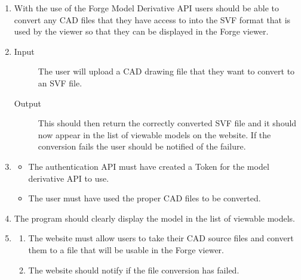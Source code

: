 \documentclass[letterpaper, 10pt, draftclsnofoot, compsoc, onecolumn]{IEEEtran}
\begin{document}
\begin{enumerate}
	\item With the use of the Forge Model Derivative API users should be able to convert any CAD files that they have access to into the SVF format
	that is used by the viewer so that they can be displayed in the Forge viewer.
	
	\item
	\begin{description}
		\item[Input] The user will upload a CAD drawing file that they want to convert to an SVF file. 
		\item[Output] This should then return the correctly converted SVF file and it should now appear in the list of 
		viewable models on the website. If the conversion fails the user should be notified of the failure.
	\end{description}

	\item
	\begin{itemize}
		\item The authentication API must have created a Token for the model derivative API to use.
		\item The user must have used the proper CAD files to be converted. 
	\end{itemize}

	\item The program should clearly display the model in the list of viewable models.

	\item
	\begin{enumerate}
		\item The website must allow users to take their CAD source files and convert them to a file that will be usable in the
	Forge viewer. 
		\item The website should notify if the file conversion has failed.
	\end{enumerate}   
\end{enumerate}
\end{document}
